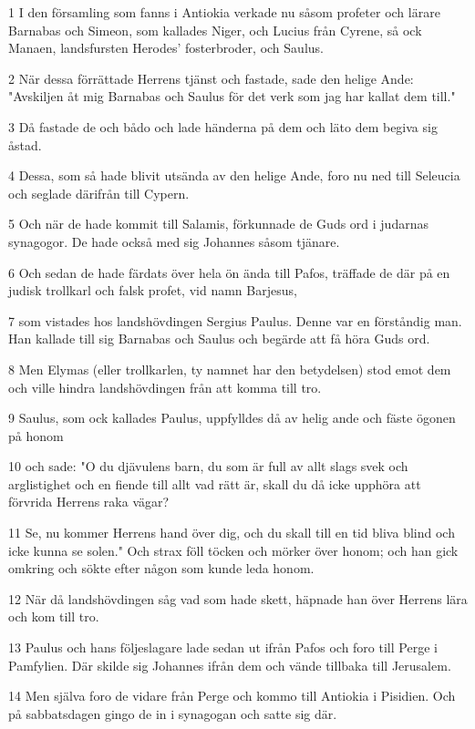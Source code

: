 \par 1 I den församling som fanns i Antiokia verkade nu såsom profeter och lärare Barnabas och Simeon, som kallades Niger, och Lucius från Cyrene, så ock Manaen, landsfursten Herodes' fosterbroder, och Saulus.
\par 2 När dessa förrättade Herrens tjänst och fastade, sade den helige Ande: "Avskiljen åt mig Barnabas och Saulus för det verk som jag har kallat dem till."
\par 3 Då fastade de och bådo och lade händerna på dem och läto dem begiva sig åstad.
\par 4 Dessa, som så hade blivit utsända av den helige Ande, foro nu ned till Seleucia och seglade därifrån till Cypern.
\par 5 Och när de hade kommit till Salamis, förkunnade de Guds ord i judarnas synagogor. De hade också med sig Johannes såsom tjänare.
\par 6 Och sedan de hade färdats över hela ön ända till Pafos, träffade de där på en judisk trollkarl och falsk profet, vid namn Barjesus,
\par 7 som vistades hos landshövdingen Sergius Paulus. Denne var en förståndig man. Han kallade till sig Barnabas och Saulus och begärde att få höra Guds ord.
\par 8 Men Elymas (eller trollkarlen, ty namnet har den betydelsen) stod emot dem och ville hindra landshövdingen från att komma till tro.
\par 9 Saulus, som ock kallades Paulus, uppfylldes då av helig ande och fäste ögonen på honom
\par 10 och sade: "O du djävulens barn, du som är full av allt slags svek och arglistighet och en fiende till allt vad rätt är, skall du då icke upphöra att förvrida Herrens raka vägar?
\par 11 Se, nu kommer Herrens hand över dig, och du skall till en tid bliva blind och icke kunna se solen." Och strax föll töcken och mörker över honom; och han gick omkring och sökte efter någon som kunde leda honom.
\par 12 När då landshövdingen såg vad som hade skett, häpnade han över Herrens lära och kom till tro.
\par 13 Paulus och hans följeslagare lade sedan ut ifrån Pafos och foro till Perge i Pamfylien. Där skilde sig Johannes ifrån dem och vände tillbaka till Jerusalem.
\par 14 Men själva foro de vidare från Perge och kommo till Antiokia i Pisidien. Och på sabbatsdagen gingo de in i synagogan och satte sig där.
